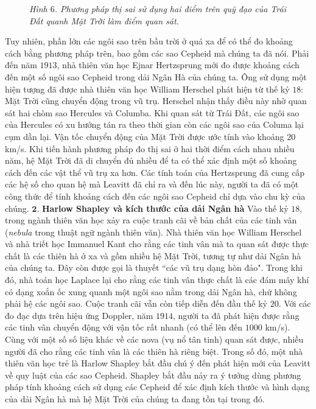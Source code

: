 \begin{multicols}{2}
\begin{figure}[H]
		\caption{\small\textit{\color{timhieukhoahoc}Hình $6$. Phương pháp thị sai sử dụng hai điểm trên quỹ đạo của Trái Đất quanh Mặt Trời làm điểm quan sát.}}
		\vspace*{-10pt}
	\end{figure}
	Tuy nhiên, phần lớn các ngôi sao trên bầu trời ở quá xa để có thể đo khoảng cách bằng phương pháp trên, bao gồm các sao Cepheid mà chúng ta đã nói. Phải đến năm $1913$, nhà thiên văn học Ejnar Hertzsprung mới đo được khoảng cách đến một số ngôi sao Cepheid trong dải Ngân Hà của chúng ta. Ông sử dụng một hiện tượng đã được nhà thiên văn học William Herschel phát hiện từ thế kỷ $18$: Mặt Trời cũng chuyển động trong vũ trụ. Herschel nhận thấy điều này nhờ quan sát hai chòm sao Hercules và Columba. Khi quan sát từ Trái Đất, các ngôi sao của Hercules có xu hướng tán ra theo thời gian còn các ngôi sao của Columa lại cụm dần lại. Vận tốc chuyển động của Mặt Trời được ước tính vào khoảng $20$ km/s. Khi tiến hành phương pháp đo thị sai ở hai thời điểm cách nhau nhiều năm, hệ Mặt Trời đã di chuyển đủ nhiều để ta có thể xác định một số khoảng cách đến các vật thể vũ trụ xa hơn. Các tính toán của Hertzsprung đã cung cấp các hệ số cho quan hệ mà Leavitt đã chỉ ra và đến lúc này, người ta đã có một công thức để tính khoảng cách đến các ngôi sao Cepheid chỉ dựa vào chu kỳ của chúng.
	\vskip 0.1cm
	$\pmb{2.}$ \textbf{\color{timhieukhoahoc}Harlow Shapley và kích thước của dải Ngân hà}
	\vskip 0.1cm
	Vào thế kỷ $18$, trong ngành thiên văn học xảy ra cuộc tranh cãi về bản chất của các tinh vân (\textit{nebula} trong thuật ngữ ngành thiên văn). Nhà thiên văn học William Herschel và nhà triết học Immanuel Kant cho rằng các tinh vân mà ta quan sát được thực chất là các thiên hà ở xa và gồm nhiều hệ Mặt Trời, tương tự như dải Ngân hà của chúng ta. Đây còn được gọi là thuyết ``các vũ trụ dạng hòn đảo". Trong khi đó, nhà toán học Laplace lại cho rằng các tinh vân thực chất là các đám mây khí có dạng xoắn ốc xung quanh một ngôi sao nằm trong dải Ngân hà, chứ không phải hệ các ngôi sao. Cuộc tranh cãi vẫn còn tiếp diễn đến đầu thế kỷ $20$.
	\vskip 0.1cm
	Với các đo đạc dựa trên hiệu ứng Doppler, năm $1914$, người ta đã phát hiện được rằng các tinh vân chuyển động với vận tốc rất nhanh (có thể lên đến $1000$ km/s). Cùng với một số số liệu khác về các nova (vụ nổ tân tinh) quan sát được, nhiều người đã cho rằng các tinh vân là các thiên hà riêng biệt. Trong số đó, một nhà thiên văn học trẻ là Harlow Shapley bắt đầu chú ý đến phát hiện mới của Leavitt về quy luật của các sao Cepheid. Shapley bắt đầu nảy ra ý tưởng dùng phương pháp tính khoảng cách sử dụng các Cepheid để xác định kích thước và hình dạng của dải Ngân hà mà hệ Mặt Trời của chúng ta đang tồn tại trong đó.

\end{multicols}
